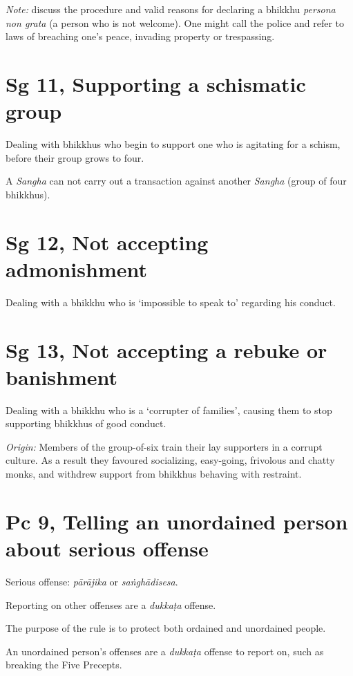 \emph{Note:} discuss the procedure and valid reasons for declaring a
bhikkhu \emph{persona non grata} (a person who is not welcome). One
might call the police and refer to laws of breaching one's peace,
invading property or trespassing.

\section{Sg 11, Supporting a schismatic group}

Dealing with bhikkhus who begin to support one who is agitating for a
schism, before their group grows to four.

A \emph{Sangha} can not carry out a transaction against another
\emph{Sangha} (group of four bhikkhus).

\section{Sg 12, Not accepting admonishment}

Dealing with a bhikkhu who is `impossible to speak to' regarding his
conduct.

\clearpage

\section{Sg 13, Not accepting a rebuke or banishment}

Dealing with a bhikkhu who is a `corrupter of families', causing them to
stop supporting bhikkhus of good conduct.

\emph{Origin:} Members of the group-of-six train their lay supporters in
a corrupt culture. As a result they favoured socializing, easy-going,
frivolous and chatty monks, and withdrew support from bhikkhus behaving
with restraint.

\section{Pc 9, Telling an unordained person about serious offense}

Serious offense: \emph{pārājika} or \emph{saṅghādisesa}.

Reporting on other offenses are a \emph{dukkaṭa} offense.

The purpose of the rule is to protect both ordained and unordained
people.

An unordained person's offenses are a \emph{dukkaṭa} offense to report
on, such as breaking the Five Precepts.

